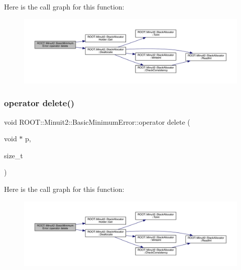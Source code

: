 Here is the call graph for this function\+:
\nopagebreak
\begin{figure}[H]
\begin{center}
\leavevmode
\includegraphics[width=350pt]{d9/ddd/classROOT_1_1Minuit2_1_1BasicMinimumError_ae64544fb94b090a6a9117243c5fa9f93_cgraph}
\end{center}
\end{figure}
\mbox{\label{classROOT_1_1Minuit2_1_1BasicMinimumError_ae64544fb94b090a6a9117243c5fa9f93}} 
\subsubsection{\texorpdfstring{operator delete()}{operator delete()}\hspace{0.1cm}{\footnotesize\ttfamily [3/3]}}
{\footnotesize\ttfamily void R\+O\+O\+T\+::\+Minuit2\+::\+Basic\+Minimum\+Error\+::operator delete (\begin{DoxyParamCaption}\item[{void $\ast$}]{p,  }\item[{size\+\_\+t}]{ }\end{DoxyParamCaption})\hspace{0.3cm}{\ttfamily [inline]}}

Here is the call graph for this function\+:
\nopagebreak
\begin{figure}[H]
\begin{center}
\leavevmode
\includegraphics[width=350pt]{d9/ddd/classROOT_1_1Minuit2_1_1BasicMinimumError_ae64544fb94b090a6a9117243c5fa9f93_cgraph}
\end{center}
\end{figure}
\mbox{\label{classROOT_1_1Minuit2_1_1BasicMinimumError_a722b14848c4cb4144f4ba7cdf90e5ef3}} 
